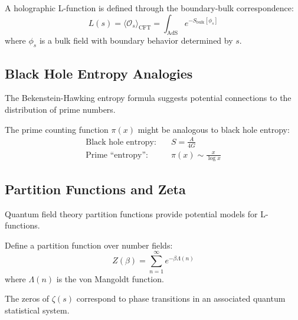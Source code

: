 \begin{definition}
\label{def:holographic_l_function}
A holographic L-function is defined through the boundary-bulk correspondence:
\begin{equation}
L(s) = \langle \mathcal{O}_s \rangle_{\text{CFT}} = \int_{\text{AdS}} e^{-S_{\text{bulk}}[\phi_s]}
\label{eq:holographic_l_function}
\end{equation}
where $\phi_s$ is a bulk field with boundary behavior determined by $s$.
\end{definition}

\subsection{Black Hole Entropy Analogies}

The Bekenstein-Hawking entropy formula suggests potential connections to the distribution of prime numbers.

\begin{analogy}
\label{analogy:prime_entropy}
The prime counting function $\pi(x)$ might be analogous to black hole entropy:
\begin{align}
\text{Black hole entropy:} \quad & S = \frac{A}{4G} \\
\text{Prime ``entropy'':} \quad & \pi(x) \sim \frac{x}{\log x}
\label{eq:prime_entropy_analogy}
\end{align}
\end{analogy}

\subsection{Partition Functions and Zeta}

Quantum field theory partition functions provide potential models for L-functions.

\begin{definition}
\label{def:nt_partition_function}
Define a partition function over number fields:
\begin{equation}
Z(\beta) = \sum_{n=1}^{\infty} e^{-\beta \Lambda(n)}
\label{eq:nt_partition_function}
\end{equation}
where $\Lambda(n)$ is the von Mangoldt function.
\end{definition}

\begin{conjecture}
\label{conj:quantum_statistical_rh}
The zeros of $\zeta(s)$ correspond to phase transitions in an associated quantum statistical system.
\end{conjecture}

